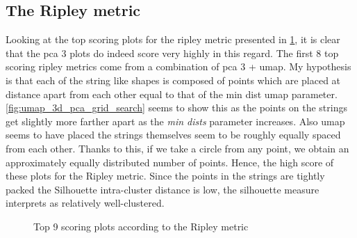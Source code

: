 \documentclass[11pt]{article}
\begin{document}
\subsection{The Ripley metric}

Looking at the top scoring plots for the ripley metric presented in \ref{fig:top_ripley}, it is clear that the pca 3 plots do indeed score very highly in this regard. The first 8 top scoring ripley metrics come from a combination of pca 3 + umap. My hypothesis is that each of the string like shapes is composed of points which are placed at distance apart from each other equal to that of the min dist umap parameter. \ref{fig:umap_3d_pca_grid_search} seems to show this as the points on the strings get slightly more farther apart as the \textit{min dists} parameter increases. Also umap seems to have placed the strings themselves seem to be roughly equally spaced from each other. Thanks to this, if we take a circle from any point, we obtain an approximately equally distributed number of points. Hence, the high score of these plots for the Ripley metric. Since the points in the strings are tightly packed the Silhouette intra-cluster distance is low, the silhouette measure interprets as relatively well-clustered.

\begin{figure}[htbp]
\centering
{}
\caption{Top 9 scoring plots according to the Ripley metric}
\label{fig:top_ripley}
\end{figure}
\end{document}
